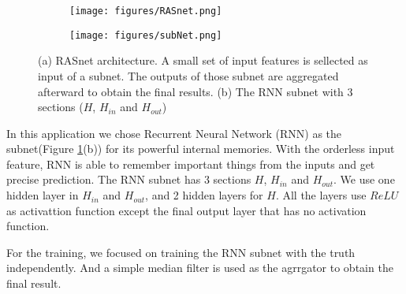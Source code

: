 \documentclass{article}
\begin{document}

\begin{figure}[h]
  \centering
  \begin{subfigure}[b]{0.4\linewidth}
    \texttt{[image: figures/RASnet.png]}
    \caption{}
  \end{subfigure} 
  \begin{subfigure}[b]{0.28\linewidth}
    \texttt{[image: figures/subNet.png]}
    \caption{}
  \end{subfigure}
  \caption{(a) RASnet architecture. A small set of input features is sellected as input of a subnet. The outputs of those subnet are aggregated afterward to obtain the final results. (b) The RNN subnet with 3 sections ($H$, $H_{in}$ and $H_{out}$) }
  \label{xxNet}
\end{figure}



In this application we chose Recurrent Neural Network (RNN) as the subnet(Figure \ref{xxNet}(b)) for its powerful internal memories.
With the orderless input feature, RNN is able to remember important things from the inputs and get precise prediction. The RNN subnet has 3 sections $H$, $H_{in}$ and $H_{out}$. We use one hidden layer in $H_{in}$ and $H_{out}$, and 2 hidden layers for $H$.
 All the layers use $ReLU$ as activattion function except the final output layer that has no activation function. 


For the training, we focused on training the RNN subnet with the truth independently. And a simple median filter is used as the agrrgator to obtain the final result.
\end{document}
